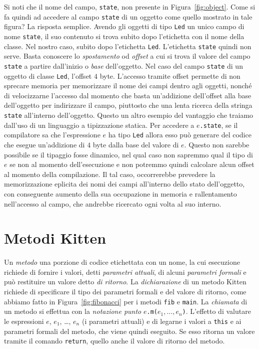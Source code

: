 Si noti che il nome del campo, \texttt{state}, non \e presente
in Figura~\ref{fig:object}. Come si fa quindi ad accedere al campo
\texttt{state} di un oggetto come quello mostrato in tale figura?
La risposta \e semplice. Avendo gli oggetti di tipo \texttt{Led} un unico
campo di nome \texttt{state}, il suo contenuto si trova subito dopo
l'etichetta con il nome della classe. Nel nostro caso, subito dopo
l'etichetta \texttt{Led}. L'etichetta \texttt{state} quindi non serve.
Basta conoscere lo \emph{spostamento} od \emph{offset} a cui si trova
il valore del campo \texttt{state} a partire dall'inizio o \emph{base}
dell'oggetto. Nel caso del campo \texttt{state} di un oggetto di classe
\texttt{Led}, l'offset \e $4$ byte. L'accesso tramite offset permette
di non sprecare memoria per memorizzare il nome dei campi dentro agli
oggetti, nonch\'e di velocizzarne l'accesso dal momento che
basta un'addizione dell'offset alla base dell'oggetto per indirizzare il campo,
piuttosto che una lenta ricerca della stringa \texttt{state} all'interno
dell'oggetto. Questo \e un altro esempio del vantaggio che traiamo dall'uso
di un linguaggio a tipizzazione statica. Per accedere a $e$\texttt{.state},
se il compilatore sa che l'espressione $e$ ha tipo \texttt{Led} allora
esso pu\`o generare del codice che esegue
un'addizione di $4$ byte dalla base del valore di $e$. Questo non sarebbe
possibile se il tipaggio fosse dinamico, nel qual caso non sapremmo
qual \e il tipo di $e$ se non al momento dell'esecuzione e non potremmo
quindi calcolare alcun offset al momento della compilazione. Il tal caso,
occorrerebbe prevedere la memorizzazione eplicita dei nomi dei campi
all'interno dello stato dell'oggetto, con conseguente aumento della sua
occupazione in memoria e rallentamento nell'accesso al campo, che andrebbe
ricercato ogni volta al suo interno.
%
\section{Metodi Kitten}\label{sec:methods}
%
Un \emph{metodo} \e una porzione di codice etichettata con un nome, la cui
esecuzione richiede di fornire i valori, detti \emph{parametri attuali},
di alcuni \emph{parametri formali}
e pu\`o restituire un valore detto \emph{di ritorno}. La \emph{dichiarazione}
di un metodo Kitten richiede di specificare il tipo dei parametri formali
e del valore di ritorno, come abbiamo fatto
in Figura~\ref{fig:fibonacci} per i metodi \texttt{fib} e \texttt{main}.
La \emph{chiamata} di un metodo si effettua con la \emph{notazione punto}
$e$\texttt{.m(}$e_1,\ldots,e_n$\texttt{)}. L'effetto \e di valutare le
espressioni $e$, $e_1$, \ldots, $e_n$ (i parametri attuali)
e di legarne i valori a \texttt{this} e ai parametri formali del metodo, che
viene quindi eseguito. Se esso ritorna un valore tramite il comando
\texttt{return}, quello \e anche il valore di ritorno del metodo.

